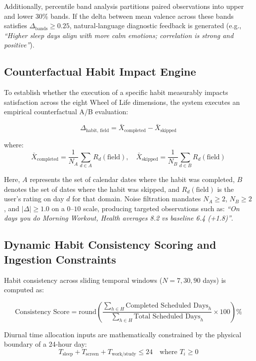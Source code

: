 Additionally, percentile band analysis partitions paired observations into upper and lower 30\% bands. If the delta between mean valence across these bands satisfies $\Delta_{\text{bands}} \ge 0.25$, natural-language diagnostic feedback is generated (e.g., \textit{``Higher sleep days align with more calm emotions; correlation is strong and positive''}).

\subsection{Counterfactual Habit Impact Engine}
To establish whether the execution of a specific habit measurably impacts satisfaction across the eight Wheel of Life dimensions, the system executes an empirical counterfactual A/B evaluation:

\begin{equation}
\Delta_{\text{habit, field}} = \bar{X}_{\text{completed}} - \bar{X}_{\text{skipped}}
\end{equation}

where:
\begin{equation}
\bar{X}_{\text{completed}} = \frac{1}{N_A}\sum_{d \in A} R_d(\text{field}), \quad \bar{X}_{\text{skipped}} = \frac{1}{N_B}\sum_{d \in B} R_d(\text{field})
\end{equation}

Here, $A$ represents the set of calendar dates where the habit was completed, $B$ denotes the set of dates where the habit was skipped, and $R_d(\text{field})$ is the user's rating on day $d$ for that domain. Noise filtration mandates $N_A \ge 2$, $N_B \ge 2$, and $|\Delta| \ge 1.0$ on a $0\text{--}10$ scale, producing targeted observations such as: \textit{``On days you do Morning Workout, Health averages 8.2 vs baseline 6.4 (+1.8)''}.

\subsection{Dynamic Habit Consistency Scoring and Ingestion Constraints}
Habit consistency across sliding temporal windows ($N = 7, 30, 90$ days) is computed as:

\begin{equation}
\text{Consistency Score} = \text{round}\left(\frac{\sum_{h \in H} \text{Completed Scheduled Days}_h}{\sum_{h \in H} \text{Total Scheduled Days}_h} \times 100\right)\%
\end{equation}

Diurnal time allocation inputs are mathematically constrained by the physical boundary of a 24-hour day:
\begin{equation}
T_{\text{sleep}} + T_{\text{screen}} + T_{\text{work/study}} \le 24 \quad \text{where } T_i \ge 0
\end{equation}

